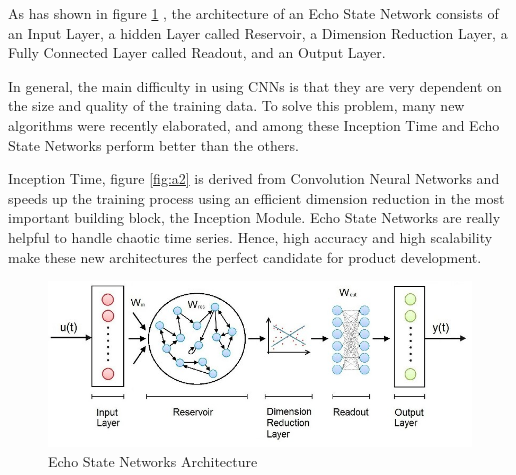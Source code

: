 As has shown in figure \ref{fig:a3} , the architecture of an Echo State Network consists of an Input Layer, a hidden Layer called Reservoir, a Dimension Reduction Layer, a Fully Connected Layer called Readout, and an Output Layer.

In general, the main difficulty in using CNNs is that they are very dependent on the size and quality of the training data. To solve this problem, many new algorithms were recently elaborated, and among these Inception Time and Echo State Networks perform better than the others. 

Inception Time, figure \ref{fig:a2} is derived from Convolution Neural Networks and speeds up the training process using an efficient dimension reduction in the most important building block, the Inception Module. Echo State Networks are really helpful to handle chaotic time series. Hence, high accuracy and high scalability make these new architectures the perfect candidate for product development.
\begin{figure}[H]
    \centering
    \begin{minipage}[b]{\textwidth}
        \includegraphics[width=\textwidth]{manuscript/src/figures/project/app3.jpeg}
    \end{minipage}
    \caption{Echo State Networks Architecture \cite{Bianchi2018ReservoirSeries}}
    \label{fig:a3}
\end{figure}